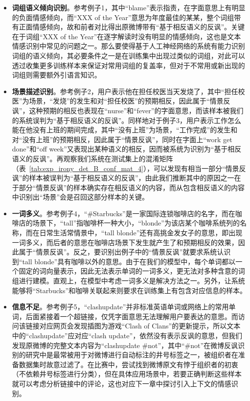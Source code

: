 \begin{itemize}

\item {\bf 词组语义倾向识别}。参考例子1，其中“blame”表示指责，在字面意思上有明显的负面情感倾向，而“XXX of the Year”意思为年度最佳的某某，整个词组带有正面情感倾向，故和前者对比得出原微博带有“基于相反语义的反讽”。关键在于词组“XXX of the Year”在逐字解读时没有明显的情感倾向，这也是文本情感识别中常见的问题之一。那么要使得基于人工神经网络的系统有能力识别词组的语义倾向，其必要条件之一是在训练集中出现过类似的词组，对此可以透过收集更多训练样本来保证对常用词组的复盖率，但对于不常用或新出现的词组则需要额外引语言知识。

\item {\bf 场景描述识别}。参考例子2，用户表示他在担任校医当天发烧了，其中“担任校医”为场景，“发烧”的发生和对“担任校医”的预期相反，因此属于“情景反讽”，这种预期的相反也表现在“nurse”和“fever”的字面意思，而该样本被我们的系统误判为“基于相反语义的反讽”。同样地对于例子3，用户表示工作怎么能在他没有上班的期间完成，其中“没有上班”为场景，“工作完成”的发生和对“没有上班”的预期相反，因此属于“情景反讽”，同时在字面上“work get done”和“off week”又表现出某种语义的相反，因而被系统为识别为“基于相反语义的反讽”。再观察我们系统在测试集上的混淆矩阵（表~\ref{tab:exp_irony_det_B_conf_mat_4}），可以发现有相当一部分“情景反讽”的样本被误判为“基于相反语义的反讽”，由此我们推断其中的原因之一在于部分“情景反讽”的样本确实存在相反语义的内容，而从包含相反语义的内容中识别出“场景”会是召回这部分样本的关键。

\item {\bf 一词多义}。参考例子4，“\#Starbucks”是一家国际连锁咖啡店的名字，而在咖啡店的场景下，“tall”指咖啡杯一种大小，“blonde”为该店某个咖啡系统列的名称，而在日常生活常情景中，“tall blonde”还有高挑金发女子的意思，即出现一词多义，而后者的意思在咖啡店场景下发生就产生了和预期相反的效果，因此属于“情景反讽”。反之，要识别出例子中的“情景反讽”就要求系统认识到“tall blonde”具有咖啡以外的意思。由于在我们的模型中，每个单词都以一个固定的词向量表示，因此无法表示单词的一词多义，更无法对多种含意的词组进行建模。直观上，在模型中考虑一词多义是解决方法之一。另外，让系统能够将“Starbucks”和咖啡关联起来则要求在训练集上有包含对应信息的样本。

\item {\bf 信息不足}。参考例子5，“clashupdate”并非标准英语单词或网络上的常用单词，后面紧接着一个超链接，仅凭字面意思无法理解用户要表达的意思。而访问该链接对应网页会发现插图为游戏“Clash of Clans”的更新提示，所以文本中的“clashupdate”应对应“clash update”，依然没有表示反讽的意思，但我们发现原微博的完整文本内容为“clashupdate \#not”，其中“\#not”在微博反讽识别的研究中是最常被用于对微博进行自动标注的井号标签之一，被组织者在准备数据集时故意过滤了。在比赛中，尝试找到微博原文有悖于组织者的初衷（不依赖井号标签进行分类），但在具体应用场景中，若要正确判断这些样本就可以考虑分析链接中的评论，这也对应下一章中探讨引入上下文的情感识别。

\end{itemize}


